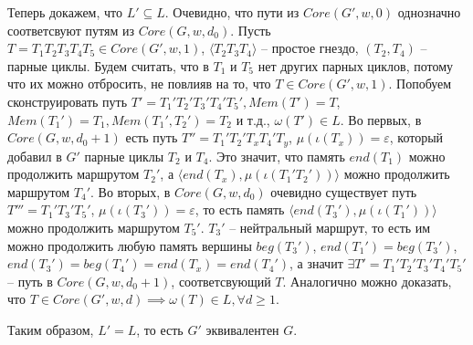 \documentclass{article}
\newenvironment{proof}[1][Доказательство]{\begin{trivlist}
\item[\hskip \labelsep {\bfseries #1}]}{\end{trivlist}}
\newcommand{\qed}{\nobreak \ifvmode \relax \else
      \ifdim\lastskip<1.5em \hskip-\lastskip
      \hskip1.5em plus0em minus0.5em \fi \nobreak
      \vrule height0.75em width0.5em depth0.25em\fi}
\begin{document}
\begin{proof}
    Теперь докажем, что $L' \subseteq L$. 
    Очевидно, что пути из $Core(G', w, 0)$ однозначно соответсвуют путям из $Core(G, w, d_0)$. 
    Пусть $T = T_1 T_2 T_3 T_4 T_5 \in Core(G', w, 1)$, 
    $\langle T_2 T_3 T_4 \rangle$ -- простое гнездо, $(T_2, T_4)$ -- парные циклы.
    Будем считать, что в $T_1$ и $T_5$ нет других парных циклов,
    потому что их можно отбросить, не повлияв на то, что $T \in Core(G',w,1)$. 
    Попобуем сконструировать путь $T' = T_1' T_2' T_3' T_4' T_5', Mem(T') = T$, 
    $Mem(T_1') = T_1, Mem(T_1', T_2') = T_2$ и т.д., $\omega(T') \in L$.
    Во первых, в $Core(G, w, d_0 + 1)$ есть путь $T'' = T_1' T_2' T_x T_4' T_y$, $\mu(\iota(T_x)) = \varepsilon$, 
    который добавил в $G'$ парные циклы $T_2$ и $T_4$.
    Это значит, что память $end(T_1)$ можно продолжить маршрутом $T_2'$, 
    а $\langle end(T_x), \mu(\iota(T_1' T_2')) \rangle$ можно продолжить маршрутом $T_4'$.
    Во вторых, в $Core(G, w, d_0)$ очевидно существует путь $T''' = T_1' T_3' T_5'$, $\mu(\iota(T_3')) = \varepsilon$, 
    то есть память $\langle end(T_3'), \mu(\iota(T_1')) \rangle$ можно продолжить маршрутом  $T_5'$. 
    $T_3'$ -- нейтральный маршрут, то есть им можно продолжить любую память вершины $beg(T_3')$, 
    $end(T_1') = beg(T_3')$, $end(T_3') = beg(T_4') = end(T_x) = end(T_4')$, а значит 
    $\exists T' = T_1' T_2' T_3' T_4' T_5'$ -- путь в $Core(G, w, d_0 + 1)$, 
    соответсвующий $T$. Аналогично можно доказать, что $T \in Core(G', w, d) \implies \omega(T) \in L, \forall d \geq 1$.

    Таким образом, $L' = L$, то есть $G'$ эквивалентен $G$.
    \qed 
    

\end{proof}
\end{document}
